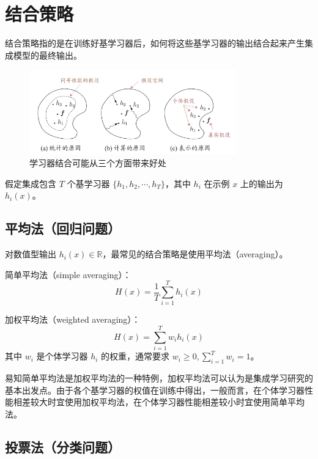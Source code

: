 \documentclass[12pt, a4paper]{article} %
\begin{document}
\section{结合策略}

结合策略指的是在训练好基学习器后，如何将这些基学习器的输出结合起来产生集成模型的最终输出。

\begin{figure}[H]
    \centering
    \includegraphics[width=0.8\textwidth]{../img/8-6-学习器结合可能从三个方面带来好处.png}
    \caption{学习器结合可能从三个方面带来好处}
    \label{fig:学习器结合可能从三个方面带来好处}
\end{figure}

假定集成包含 $T$ 个基学习器 $\{h_1, h_2, \cdots, h_T \}$，其中 $h_i$ 在示例 $x$ 上的输出为 $h_i (x)$。

\subsection{平均法（回归问题）}

对数值型输出 $h_i (x) \in \mathbb{R}$，最常见的结合策略是使用平均法（averaging）。

简单平均法（simple averaging）：
\begin{equation*}
    H(x) = \frac{1}{T} \sum_{i = 1}^{T} h_i (x)
\end{equation*}

加权平均法（weighted averaging）：
\begin{equation*}
    H(x) = \sum_{i = 1}^T w_i h_i (x)
\end{equation*}
其中 $w_i$ 是个体学习器 $h_i$ 的权重，通常要求 $w_i \ge 0, \displaystyle \sum_{i= 1}^T w_i = 1$。

易知简单平均法是加权平均法的一种特例，加权平均法可以认为是集成学习研究的基本出发点。由于各个基学习器的权值在训练中得出，一般而言，在个体学习器性能相差较大时宜使用加权平均法，在个体学习器性能相差较小时宜使用简单平均法。

\subsection{投票法（分类问题）}
\end{document}
